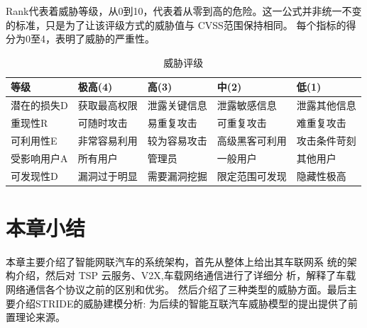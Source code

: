 Rank代表着威胁等级，从0到10，代表着从零到高的危险。这一公式并非统一不变的标准，只是为了让该评级方式的威胁值与 CVSS范围保持相同。
每个指标的得分为0至4，表明了威胁的严重性。

\begin{table}
  \caption{威胁评级}
\begin{center}
  \begin{tabular}{|l|l|l|l|l|}
    \hline 等级 & 极高(4) & 高(3) & 中(2) & 低(1) \\
    \hline 潜在的损失D & 获取最高权限 & 泄露关键信息 & 泄露敏感信息 & 泄露其他信息 \\
    \hline 重现性R & 可随时攻击 & 易重复攻击 & 可重复攻击 & 难重复攻击 \\
    \hline 可利用性E & 非常容易利用 & 较为容易攻击 & 高级黑客可利用 & 攻击条件苛刻 \\
    \hline 受影响用户A & 所有用户 & 管理员 & 一般用户 & 其他用户 \\
    \hline 可发现性D & 漏洞过于明显 & 需要漏洞挖掘 & 限定范围可发现 & 隐藏性极高 \\
    \hline
    \end{tabular}
\end{center}
\end{table}




    

\section{本章小结}

本章主要介绍了智能网联汽车的系统架构，首先从整体上给出其车联网系
统的架构介绍，然后对 TSP 云服务、V2X,车载网络通信进行了详细分
析，解释了车载网络通信各个协议之前的区别和优劣。
然后介绍了三种类型的威胁方面。最后主要介绍STRIDE的威胁建模分析:
为后续的智能互联汽车威胁模型的提出提供了前置理论来源。